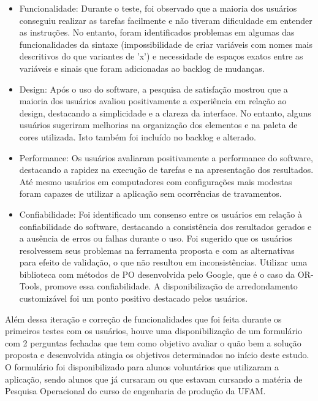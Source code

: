 \documentclass{article}
\begin{document}
\begin{itemize}
\item Funcionalidade: Durante o teste, foi observado que a maioria dos usuários conseguiu realizar as tarefas facilmente e não tiveram dificuldade em entender as instruções. No entanto, foram identificados problemas em algumas das funcionalidades da sintaxe (impossibilidade de criar variáveis com nomes mais descritivos do que variantes de 'x') e necessidade de espaços exatos entre as variáveis e sinais que foram adicionadas ao backlog de mudanças.
\item Design: Após o uso do software, a pesquisa de satisfação mostrou que a maioria dos usuários avaliou positivamente a experiência em relação ao design, destacando a simplicidade e a clareza da interface. No entanto, alguns usuários sugeriram melhorias na organização dos elementos e na paleta de cores utilizada. Isto também foi incluído no backlog e alterado.
\item Performance: Os usuários avaliaram positivamente a performance do software, destacando a rapidez na execução de tarefas e na apresentação dos resultados. Até mesmo usuários em computadores com configurações mais modestas foram capazes de utilizar a aplicação sem ocorrências de travamentos.
\item Confiabilidade: Foi identificado um consenso entre os usuários em relação à confiabilidade do software, destacando a consistência dos resultados gerados e a ausência de erros ou falhas durante o uso. Foi sugerido que os usuários resolvessem seus problemas na ferramenta proposta e com as alternativas para efeito de validação, o que não resultou em inconsistências.  Utilizar uma biblioteca com métodos de PO desenvolvida pelo Google, que é o caso da OR-Tools, promove essa confiabilidade. A disponibilização de arredondamento customizável foi um ponto positivo destacado pelos usuários.
\end{itemize}

Além dessa iteração e correção de funcionalidades que foi feita durante os primeiros testes com os usuários, houve uma disponibilização de um formulário com 2 perguntas fechadas que tem como objetivo avaliar o quão bem a solução proposta e desenvolvida atingia os objetivos determinados no início deste estudo.
O formulário foi disponibilizado para alunos voluntários que utilizaram a aplicação, sendo alunos que já cursaram ou que estavam cursando a matéria de Pesquisa Operacional do curso de engenharia de produção da UFAM.
\end{document}
